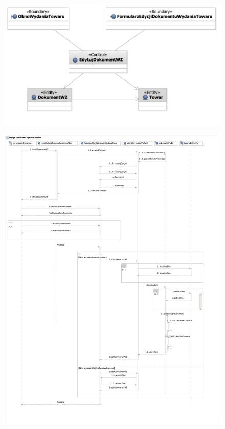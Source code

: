 \begin{figure}[H]
  \centering
  \includegraphics[angle=\ecbangle, scale=\ecbscale]{../img/usecase/pu14ecb.pdf}
  \caption{}
\end{figure}
\newpage
\begin{figure}[H]
  \centering
  \includegraphics[angle=\seqangle, scale=\seqscalemin]{../img/usecase/pu14seq.pdf}
  \caption{}
\end{figure}
\newpage

